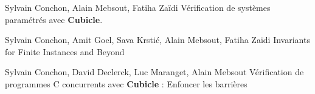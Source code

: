 \documentclass{memoir}
\begin{document}
\begin{thebibliography}{10}

Sylvain Conchon, Alain Mebsout, Fatiha Zaïdi
\newline Vérification de systèmes paramétrés avec \textbf{Cubicle}.

Sylvain Conchon, Amit Goel, Sava Krsti\'{c}, Alain Mebsout, Fatiha Zaïdi
\newline Invariants for Finite Instances and Beyond

Sylvain Conchon, David Declerck, Luc Maranget, Alain Mebsout
\newline Vérification de programmes C concurrents avec \textbf{Cubicle} : Enfoncer les barrières

\end{thebibliography}
\end{document}
